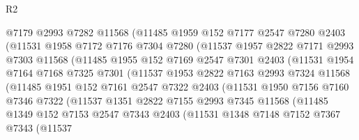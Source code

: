 \begin{lexlean}{R2}
\begin{coremodule}
                @7179
                @2993
                @7282
                @11568
                (@11485
                  @1959
                  @152
                  @7177
                  @2547
                  @7280
                  @2403
                  (@11531
                    @1958
                    @7172
                    @7176
                    @7304
                    @7280
                    (@11537
                      @1957
                      @2822
                      @7171
                      @2993
                      @7303
                      @11568
                      (@11485
                        @1955
                        @152
                        @7169
                        @2547
                        @7301
                        @2403
                        (@11531
                          @1954
                          @7164
                          @7168
                          @7325
                          @7301
                          (@11537
                            @1953
                            @2822
                            @7163
                            @2993
                            @7324
                            @11568
                            (@11485
                              @1951
                              @152
                              @7161
                              @2547
                              @7322
                              @2403
                              (@11531
                                @1950
                                @7156
                                @7160
                                @7346
                                @7322
                                (@11537
                                  @1351
                                  @2822
                                  @7155
                                  @2993
                                  @7345
                                  @11568
                                  (@11485
                                    @1349
                                    @152
                                    @7153
                                    @2547
                                    @7343
                                    @2403
                                    (@11531
                                      @1348
                                      @7148
                                      @7152
                                      @7367
                                      @7343
                                      (@11537

\end{coremodule}
\end{lexlean}
